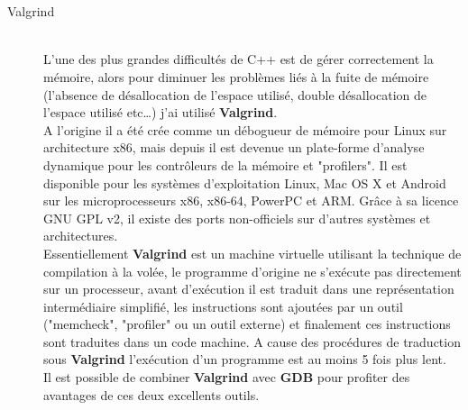 \begin{description}
  \\ \\
  \item[Valgrind] \hfill \\
L'une des plus grandes difficultés de C++ est de gérer correctement la mémoire, alors pour diminuer les problèmes liés à la fuite de mémoire (l'absence de désallocation  de l'espace utilisé, double désallocation de l'espace utilisé etc\ldots) j'ai utilisé  \textbf{Valgrind}.\\
	A l'origine il a été crée comme un débogueur de mémoire pour Linux sur architecture x86, mais depuis il est devenue un plate-forme d'analyse dynamique pour les contrôleurs de la mémoire et "profilers". Il est disponible pour les systèmes d'exploitation Linux, Mac OS X et Android sur les microprocesseurs x86, x86-64, PowerPC et ARM. Grâce à sa licence GNU GPL v2,  il existe des ports non-officiels sur d'autres systèmes et architectures.\\
	Essentiellement \textbf{Valgrind} est un machine virtuelle utilisant la technique de compilation à la volée, le programme d'origine ne s’exécute pas directement sur un processeur, avant d’exécution il est traduit dans une représentation intermédiaire simplifié, les instructions sont ajoutées par un outil ("memcheck", "profiler" ou un outil externe) et finalement ces instructions sont traduites dans un code machine. A cause des procédures de traduction sous \textbf{Valgrind} l’exécution d'un programme est au moins 5 fois plus lent.\\
	Il est possible de combiner \textbf{Valgrind} avec \textbf{GDB} pour profiter des avantages de ces deux excellents outils.
\end{description}


